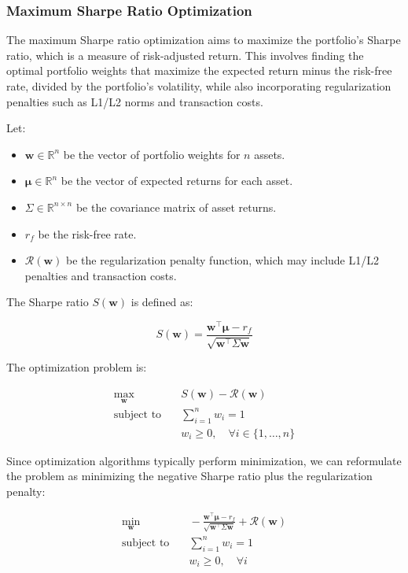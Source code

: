 \subsubsection{Maximum Sharpe Ratio Optimization}

The maximum Sharpe ratio optimization aims to maximize the portfolio's Sharpe ratio, which is a measure of risk-adjusted return. This involves finding the optimal portfolio weights that maximize the expected return minus the risk-free rate, divided by the portfolio's volatility, while also incorporating regularization penalties such as L1/L2 norms and transaction costs.

Let:

\begin{itemize}
    \item \( \mathbf{w} \in \mathbb{R}^n \) be the vector of portfolio weights for \( n \) assets.
    \item \( \boldsymbol{\mu} \in \mathbb{R}^n \) be the vector of expected returns for each asset.
    \item \( \Sigma \in \mathbb{R}^{n \times n} \) be the covariance matrix of asset returns.
    \item \( r_f \) be the risk-free rate.
    \item \( \mathcal{R}(\mathbf{w}) \) be the regularization penalty function, which may include L1/L2 penalties and transaction costs.
\end{itemize}

The Sharpe ratio \( S(\mathbf{w}) \) is defined as:

\[
S(\mathbf{w}) = \frac{\mathbf{w}^\top \boldsymbol{\mu} - r_f}{\sqrt{\mathbf{w}^\top \Sigma \mathbf{w}}}
\]

The optimization problem is:

\[
\begin{aligned}
\max_{\mathbf{w}} & \quad S(\mathbf{w}) - \mathcal{R}(\mathbf{w}) \\
\text{subject to} & \quad \sum_{i=1}^n w_i = 1 \\
& \quad w_i \geq 0, \quad \forall i \in \{1, \dots, n\}
\end{aligned}
\]

Since optimization algorithms typically perform minimization, we can reformulate the problem as minimizing the negative Sharpe ratio plus the regularization penalty:

\[
\begin{aligned}
\min_{\mathbf{w}} & \quad -\frac{\mathbf{w}^\top \boldsymbol{\mu} - r_f}{\sqrt{\mathbf{w}^\top \Sigma \mathbf{w}}} + \mathcal{R}(\mathbf{w}) \\
\text{subject to} & \quad \sum_{i=1}^n w_i = 1 \\
& \quad w_i \geq 0, \quad \forall i
\end{aligned}
\]

